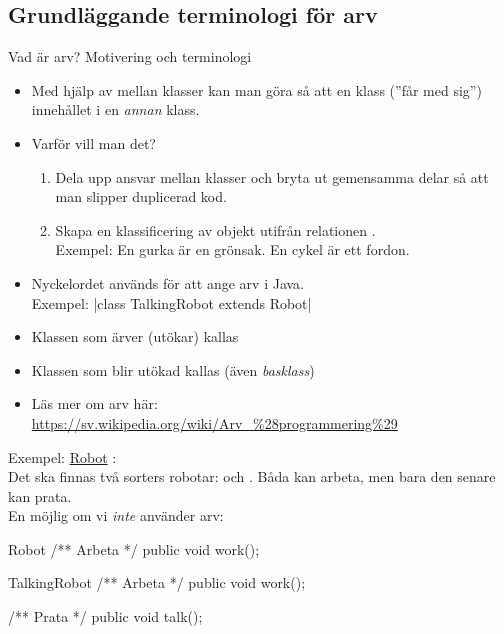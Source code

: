 \documentclass{lecturenotes}
\begin{document}
\subsection{Grundläggande terminologi för arv}
\begin{Slide}{Vad är arv? Motivering och terminologi}\footnotesize
\begin{itemize}
\item Med hjälp av  mellan klasser kan man göra så att en klass  (''får med sig'') innehållet i en \textit{annan} klass.
\item Varför vill man det? 
\begin{enumerate}\footnotesize
\item Dela upp ansvar mellan klasser och bryta ut gemensamma delar så att man slipper duplicerad kod.
\item Skapa en klassificering av objekt utifrån relationen  .  \\ Exempel: En gurka är en grönsak. En cykel är ett fordon. 
\end{enumerate}
\item Nyckelordet  används för att ange arv i Java. \\ Exempel:   \code|class TalkingRobot extends Robot|
\item Klassen som ärver (utökar) kallas 
\item Klassen som blir utökad kallas  (även \textit{basklass})
\item Läs mer om arv  här: \scriptsize \url{https://sv.wikipedia.org/wiki/Arv\_\%28programmering\%29} 
\end{itemize}
\end{Slide}

\begin{Slide}{Exempel: \href{https://www.youtube.com/watch?v=VXa9tXcMhXQ}{Robot}}
: \\ Det ska finnas två sorters robotar:  och . Båda kan arbeta, men bara den senare kan prata.
\\ \vspace{1em}
En möjlig  om vi \textit{inte} använder arv:

\begin{ClassSpec}{Robot}
/** Arbeta */
public void work();
\end{ClassSpec}

\begin{ClassSpec}{TalkingRobot}
/** Arbeta */
public void work();

/** Prata */
public void talk();
\end{ClassSpec}
\end{Slide}
\end{document}
